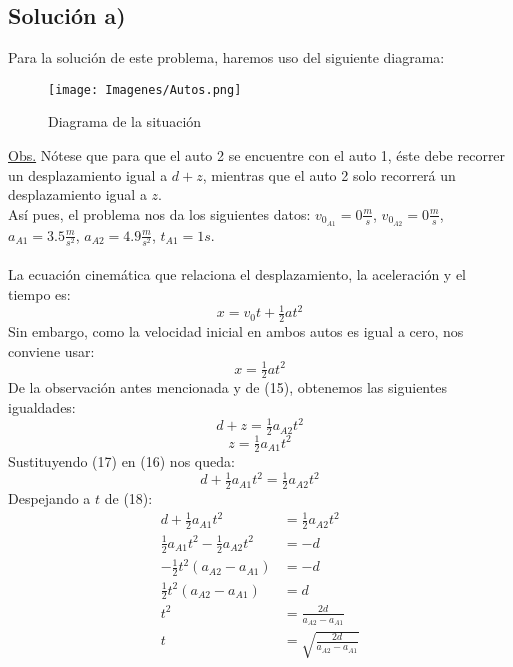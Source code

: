 \documentclass[letterpaper,12pt]{article}
\begin{document}
\begin{enumerate}
\subsection*{Solución a)}
Para la solución de este problema, haremos uso del siguiente diagrama:\\
    \begin{figure}
        \centering
        \texttt{[image: Imagenes/Autos.png]}
        \caption{Diagrama de la situación}
        \label{fig:my_label}
    \end{figure}
\underline{Obs.} Nótese que para que el auto 2 se encuentre con el auto 1, éste debe recorrer un desplazamiento igual a $d+z$, mientras que el auto 2 solo recorrerá un desplazamiento igual a $z$. \\
Así pues, el problema nos da los siguientes datos: $v_{0_{A1}}=0\frac{m}{s}$, $v_{0_{A2}}=0\frac{m}{s}$, $a_{A1}=3.5 \frac{m}{s^2}$, $a_{A2}=4.9 \frac{m}{s^2}$, $t_{A1}= 1s$. \\ \\
La ecuación cinemática que relaciona el desplazamiento, la aceleración y el tiempo es:
$$x= v_0 t + \tfrac{1}{2}a t^2$$
Sin embargo, como la velocidad inicial en ambos autos es igual a cero, nos conviene usar:
\begin{equation}
    x=  \tfrac{1}{2}a t^2
\end{equation}
De la observación antes mencionada y de (15), obtenemos las siguientes igualdades:
\begin{equation}
    d+ z= \tfrac{1}{2}a_{A2} t^2 
\end{equation}
\begin{equation}
    z= \tfrac{1}{2}a_{A1} t^2  
\end{equation}
Sustituyendo (17) en (16) nos queda:
\begin{equation}
    d+ \tfrac{1}{2}a_{A1} t^2   = \tfrac{1}{2}a_{A2} t^2 
\end{equation}
Despejando a $t$ de (18):
\begin{align*}
    d+ \tfrac{1}{2}a_{A1} t^2   &= \tfrac{1}{2}a_{A2} t^2 \\
     \tfrac{1}{2}a_{A1} t^2 -\tfrac{1}{2}a_{A2} t^2  &= -d \\
     -\tfrac{1}{2} t^2 (a_{A2}-a_{A1} )  &= -d \\
     \tfrac{1}{2} t^2 (a_{A2}-a_{A1} )  &= d \\
      t^2   &= \tfrac{2d}{a_{A2}-a_{A1} }\\
       t   &= \sqrt{\tfrac{2d}{a_{A2}-a_{A1}}} \tag{i}\\
\end{align*}


\end{enumerate}
\end{document}
